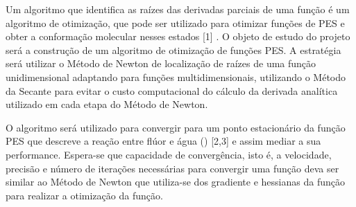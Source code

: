 
Um algoritmo que identifica as raízes das derivadas parciais de uma função é um
algoritmo de otimização, que pode ser utilizado para otimizar funções de PES e obter a
conformação molecular nesses estados [1] . O objeto de estudo do projeto será a construção de
um algoritmo de otimização de funções PES. A estratégia será utilizar o Método de Newton
de localização de raízes de uma função unidimensional adaptando para funções
multidimensionais, utilizando o Método da Secante para evitar o custo computacional do
cálculo da derivada analítica utilizado em cada etapa do Método de Newton.

O algoritmo será utilizado para convergir para um ponto estacionário da função PES
que descreve a reação entre flúor e água () [2,3] e assim mediar a sua performance.
Espera-se que capacidade de convergência, isto é, a velocidade, precisão e número de
iterações necessárias para convergir uma função deva ser similar ao Método de Newton que
utiliza-se dos gradiente e hessianas da função para realizar a otimização da função.

